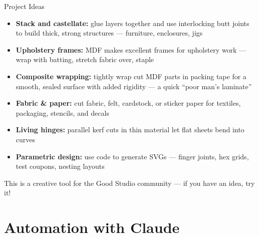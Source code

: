 \documentclass[aspectratio=169]{beamer}
\begin{document}
\begin{frame}{Project Ideas}
\begin{itemize}
    \item \textbf{Stack and castellate:} glue layers together and use interlocking
        butt joints to build thick, strong structures ---
        furniture, enclosures, jigs
    \item \textbf{Upholstery frames:} MDF makes excellent frames for
        upholstery work --- wrap with batting, stretch fabric over, staple
    \item \textbf{Composite wrapping:} tightly wrap cut MDF parts in packing tape
        for a smooth, sealed surface with added rigidity ---
        a quick ``poor man's laminate''
    \item \textbf{Fabric \& paper:} cut fabric, felt, cardstock, or sticker paper
        for textiles, packaging, stencils, and decals
    \item \textbf{Living hinges:} parallel kerf cuts in thin material
        let flat sheets bend into curves
    \item \textbf{Parametric design:} use code to generate SVGs ---
        finger joints, hex grids, test coupons, nesting layouts
\end{itemize}

\vspace{0.5em}
{\small This is a creative tool for the Good Studio community ---
if you have an idea, try it!}
\end{frame}

\section{Automation with Claude}
\end{document}
